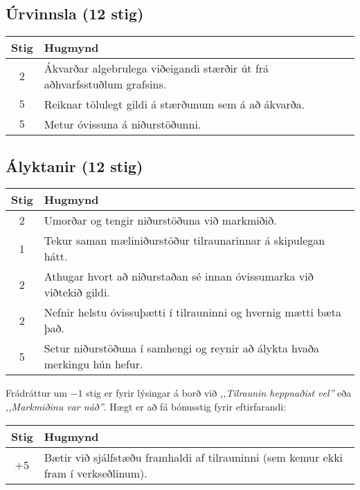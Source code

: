 \begin{tcolorbox}


\subsection*{Úrvinnsla (12 stig)}

\begin{table}[H]
    \centering
    \begin{tabular}{|c|l|}
    \hline
       \textbf{Stig}  & \textbf{Hugmynd}   \\ \hline \hline
       $2$ & Ákvarðar algebrulega viðeigandi stærðir út frá aðhvarfsstuðlum grafsins.   \\
       \hline
       $5$ & Reiknar tölulegt gildi á stærðunum sem á að ákvarða.  \\ \hline
       $5$ & Metur óvissuna á niðurstöðunni.  \\ \hline
    \end{tabular}
\end{table}





\subsection*{Ályktanir (12 stig)}


\begin{table}[H]
    \centering
    \begin{tabular}{|c|l|}
    \hline
       \textbf{Stig}  & \textbf{Hugmynd}   \\ \hline \hline
        2  &  Umorðar og tengir niðurstöðuna við markmiðið. \\ \hline
        1  & Tekur saman mæliniðurstöður tilraunarinnar á skipulegan hátt. \\ \hline
        2  & Athugar hvort að niðurstaðan sé innan óvissumarka við viðtekið gildi. \\ \hline
        2  & Nefnir helstu óvissuþætti í tilrauninni og hvernig mætti bæta það. \\ \hline
        5 & Setur niðurstöðuna í samhengi og reynir að álykta hvaða merkingu hún hefur. \\ \hline
    \end{tabular}
\end{table}

Frádráttur um $-1$ stig er fyrir lýsingar á borð við \emph{,,Tilraunin heppnaðist vel''} eða \emph{,,Markmiðinu var náð''}. Hægt er að fá bónusstig fyrir eftirfarandi:

\begin{table}[H]
    \centering
    \begin{tabular}{|c|l|}
    \hline
       \textbf{Stig}  & \textbf{Hugmynd}   \\ \hline \hline
        +5  &  Bætir við sjálfstæðu framhaldi af tilrauninni (sem kemur ekki fram í verkseðlinum). \\ \hline
    \end{tabular}
\end{table}

\end{tcolorbox}

